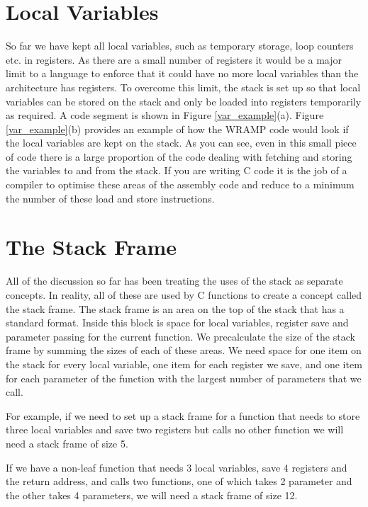 \section{Local Variables}
So far we have kept all local variables, such as temporary storage,
loop counters etc. in registers. As there are a small number of
registers it would be a major limit to a language to enforce that it
could have no more local variables than the architecture has
registers. To overcome this limit, the stack is set up so that local
variables can be stored on the stack and only be loaded into registers
temporarily as required. A code segment is shown in Figure
\ref{var_example}(a). Figure \ref{var_example}(b) provides an example
of how the WRAMP code would look if the local variables are kept on the
stack. As you can see, even in this small piece of code there is a
large proportion of the code dealing with fetching and storing the
variables to and from the stack. If you are writing C code it is the
job of a compiler to optimise these areas of the assembly code and
reduce to a minimum the number of these load and store instructions.

\section{The Stack Frame}

All of the discussion so far has been treating the uses of the stack as
separate concepts. In reality, all of these are used by C functions to create
a concept called the stack frame. The stack frame is an area on the top of the
stack that has a standard format. Inside this block is space for local
variables, register save and parameter passing for the current function. We
precalculate the size of the stack frame by summing the sizes of each of these
areas. We need space for one item on the stack for every local variable, one
item for each register we save, and one item for each parameter of the function
with the largest number of parameters that we call.

For example, if we need to set up a stack frame for a function that needs to
store three local variables and save two registers but calls no other function
we will need a stack frame of size 5.

If we have a non-leaf function that needs 3 local variables, save 4 registers
and the return address, and calls two functions, one of which takes 2 parameter
and the other takes 4 parameters, we will need a stack frame of size 12.

